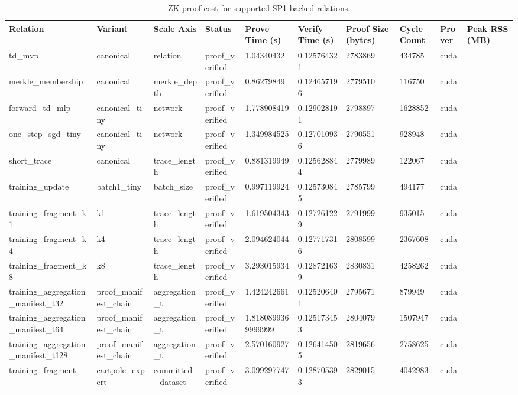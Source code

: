 \begin{table}[t]
\centering
\caption{ZK proof cost for supported SP1-backed relations.}
\label{tab:zk-proof-cost}
\begin{tabular}{lllllllll}
\toprule
Relation & Variant & Scale Axis & Status & Prove Time (s) & Verify Time (s) & Proof Size (bytes) & Cycle Count & Prover & Peak RSS (MB) \\
\midrule
td\_mvp & canonical & relation & proof\_verified & 1.04340432 & 0.125764321 & 2783869 & 434785 & cuda &  \\
merkle\_membership & canonical & merkle\_depth & proof\_verified & 0.86279849 & 0.124657196 & 2779510 & 116750 & cuda &  \\
forward\_td\_mlp & canonical\_tiny & network & proof\_verified & 1.778908419 & 0.129028191 & 2798897 & 1628852 & cuda &  \\
one\_step\_sgd\_tiny & canonical\_tiny & network & proof\_verified & 1.349984525 & 0.127010936 & 2790551 & 928948 & cuda &  \\
short\_trace & canonical & trace\_length & proof\_verified & 0.881319949 & 0.125628844 & 2779989 & 122067 & cuda &  \\
training\_update & batch1\_tiny & batch\_size & proof\_verified & 0.997119924 & 0.125730845 & 2785799 & 494177 & cuda &  \\
training\_fragment\_k1 & k1 & trace\_length & proof\_verified & 1.619504343 & 0.127261229 & 2791999 & 935015 & cuda &  \\
training\_fragment\_k4 & k4 & trace\_length & proof\_verified & 2.094624044 & 0.127717316 & 2808599 & 2367608 & cuda &  \\
training\_fragment\_k8 & k8 & trace\_length & proof\_verified & 3.293015934 & 0.128721639 & 2830831 & 4258262 & cuda &  \\
training\_aggregation\_manifest\_t32 & proof\_manifest\_chain & aggregation\_t & proof\_verified & 1.424242661 & 0.125206401 & 2795671 & 879949 & cuda &  \\
training\_aggregation\_manifest\_t64 & proof\_manifest\_chain & aggregation\_t & proof\_verified & 1.8180899369999999 & 0.125173453 & 2804079 & 1507947 & cuda &  \\
training\_aggregation\_manifest\_t128 & proof\_manifest\_chain & aggregation\_t & proof\_verified & 2.570160927 & 0.126414505 & 2819656 & 2758625 & cuda &  \\
training\_fragment & cartpole\_expert & committed\_dataset & proof\_verified & 3.099297747 & 0.128705393 & 2829015 & 4042983 & cuda &  \\

\end{tabular}
\end{table}
